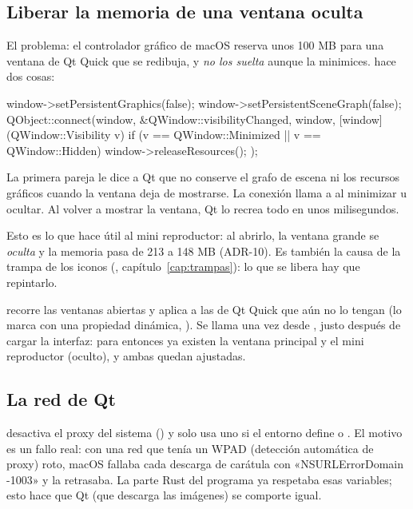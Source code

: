 \subsection{Liberar la memoria de una ventana oculta}

El problema: el controlador gráfico de macOS reserva unos 100 MB para una ventana de Qt Quick
que se redibuja, y \emph{no los suelta} aunque la minimices.  hace dos cosas:

\begin{codigo}
window->setPersistentGraphics(false);
window->setPersistentSceneGraph(false);
QObject::connect(window, &QWindow::visibilityChanged, window, [window](QWindow::Visibility v) {
    if (v == QWindow::Minimized || v == QWindow::Hidden)
        window->releaseResources();
});
\end{codigo}

La primera pareja le dice a Qt que no conserve el grafo de escena ni los recursos gráficos
cuando la ventana deja de mostrarse. La conexión llama a  al
minimizar u ocultar. Al volver a mostrar la ventana, Qt lo recrea todo en unos milisegundos.

Esto es lo que hace útil al mini reproductor: al abrirlo, la ventana grande se \emph{oculta} y
la memoria pasa de 213 a 148 MB (ADR-10). Es también la causa de la trampa de los iconos
(, capítulo~\ref{cap:trampas}): lo que se libera hay que repintarlo.

 recorre las ventanas abiertas y aplica  a las de
Qt Quick que aún no lo tengan (lo marca con una propiedad dinámica, ).
Se llama una vez desde , justo después de cargar la interfaz: para
entonces ya existen la ventana principal y el mini reproductor (oculto), y ambas quedan
ajustadas.

\subsection{La red de Qt}

 desactiva el proxy del sistema
() y solo usa uno si el entorno define
 o . El motivo es un fallo real: con una red que tenía un
WPAD (detección automática de proxy) roto, macOS fallaba cada descarga de carátula con
«NSURLErrorDomain -1003» y la retrasaba. La parte Rust del programa ya respetaba esas
variables; esto hace que Qt (que descarga las imágenes) se comporte igual.

